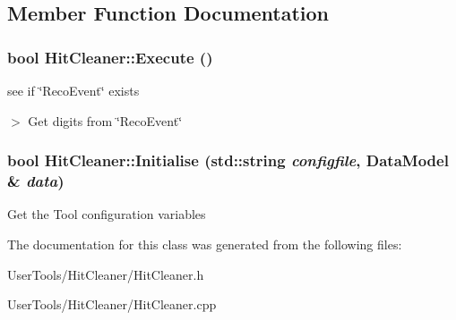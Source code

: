 \subsection{Member Function Documentation}
\hypertarget{classHitCleaner_adec5b94400dcbfc710590d7eb387041b}{
\subsubsection[{Execute}]{\setlength{\rightskip}{0pt plus 5cm}bool HitCleaner::Execute ()}}
\label{classHitCleaner_adec5b94400dcbfc710590d7eb387041b}


see if \char`\"{}RecoEvent\char`\"{} exists

$>$ Get digits from \char`\"{}RecoEvent\char`\"{} \hypertarget{classHitCleaner_a35bd6ca1401c52439166e51c7e873ace}{
\subsubsection[{Initialise}]{\setlength{\rightskip}{0pt plus 5cm}bool HitCleaner::Initialise (std::string {\em configfile}, \/  {\bf DataModel} \& {\em data})}}
\label{classHitCleaner_a35bd6ca1401c52439166e51c7e873ace}


Get the Tool configuration variables 

The documentation for this class was generated from the following files:\begin{DoxyCompactItemize}
\item 
UserTools/HitCleaner/HitCleaner.h\item 
UserTools/HitCleaner/HitCleaner.cpp\end{DoxyCompactItemize}
